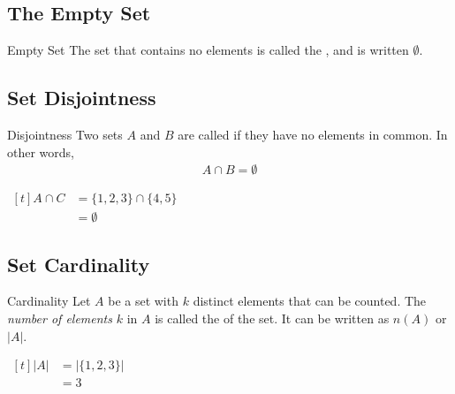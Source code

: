 \documentclass[\main/notes.tex]{subfiles}
\begin{document}
			\subsection{The Empty Set}
				\begin{definition}{Empty Set}
					The set that contains no elements is called the , and is written $\emptyset$.
				\end{definition}
			\subsection{Set Disjointness}
				\begin{definition}{Disjointness}
					Two sets $A$ and $B$ are called  if they have no elements in common. In other words,
					\begin{align*}
						A \cap B = \emptyset
					\end{align*}
				\end{definition}
				\begin{example}[hbox] $
					\begin{aligned}[t]
						A \cap C &= \{1, 2, 3\} \cap \{4, 5\}\\
						&= \emptyset
					\end{aligned} $
				\end{example}
			\pagebreak
			\subsection{Set Cardinality}
				\begin{definition}{Cardinality}
					Let $A$ be a set with $k$ distinct elements that can be counted. The \emph{number of elements} $k$ in $A$ is called the  of the set. It can be written as $n(A)$ or $\left\lvert A\right\rvert$.
				\end{definition}
				\begin{example}[hbox] $
					\begin{aligned}[t]
						\left\lvert A\right\rvert &= \bigl\lvert \{1, 2, 3\}\bigr\rvert\\
						&= 3
					\end{aligned} $
				\end{example}
\end{document}
